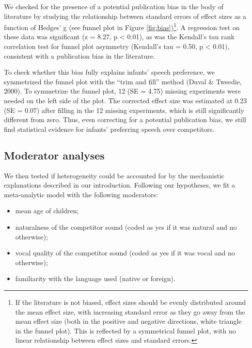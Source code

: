 \documentclass[
  english,
  man]{apa6}
\providecommand{\tightlist}{%
  \setlength{\itemsep}{0pt}\setlength{\parskip}{0pt}}
\begin{document}
We checked for the presence of a potential publication bias in the body of literature by studying the relationship between standard errors of effect sizes as a function of Hedges' g (see funnel plot in Figure \ref{fig:bias})\footnote{If the literature is not biased, effect sizes should be evenly distributed around the mean effect size, with increasing standard error as they go away from the mean effect size (both in the positive and negative directions, white triangle in the funnel plot). This is reflected by a symmetrical funnel plot, with no linear relationship between effect sizes and standard errors.}. A regression test on these data was significant (z = 8.27, p \textless{} 0.01), as was the Kendall's tau rank correlation test for funnel plot asymmetry (Kendall's tau = 0.50, p \textless{} 0.01), consistent with a publication bias in the literature.

To check whether this bias fully explains infants' speech preference, we symmetrized the funnel plot with the ``trim and fill'' method (Duval \& Tweedie, 2000). To symmetrize the funnel plot, 12 (SE = 4.75) missing experiments were needed on the left side of the plot. The corrected effect size was estimated at 0.23 (SE = 0.07) after filling in the 12 missing experiments, which is still significantly different from zero. Thus, even correcting for a potential publication bias, we still find statistical evidence for infants' preferring speech over competitors.

\hypertarget{moderator-analyses}{%
\subsection{Moderator analyses}\label{moderator-analyses}}

We then tested if heterogeneity could be accounted for by the mechanistic explanations described in our introduction. Following our hypotheses, we fit a meta-analytic model with the following moderators:

\begin{itemize}
\tightlist
\item
  mean age of children;
\item
  naturalness of the competitor sound (coded as yes if it was natural and no otherwise);
\item
  vocal quality of the competitor sound (coded as yes if it was vocal and no otherwise);
\item
  familiarity with the language used (native or foreign).
\end{itemize}
\end{document}
